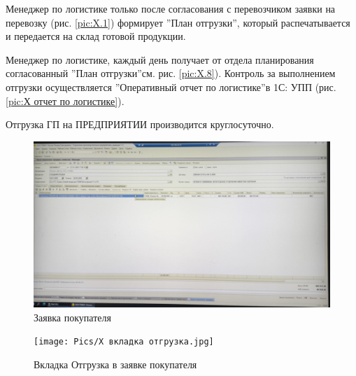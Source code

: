Менеджер по логистике только после согласования с перевозчиком заявки на перевозку (рис. \ref{pic:X.1}) формирует ''План отгрузки'', который распечатывается и передается на склад готовой продукции.

Менеджер по логистике, каждый день получает от отдела планирования согласованный ''План отгрузки''см. рис. \ref{pic:X.8}).
Контроль за выполнением отгрузки осуществляется ''Оперативный отчет по логистике''в 1С: УПП (рис. \ref{pic:Х отчет по логистике}).


Отгрузка ГП на ПРЕДПРИЯТИИ производится круглосуточно.

\clearpage

\begin{figure}
\begin{center}
 \includegraphics[height=0.35\textheight, keepaspectratio]{Pics/Х заказ покупателя.jpg}
\end{center}
 \caption{Заявка покупателя}
 \label{pic:Х заказ покупателя}
\end{figure}

\begin{figure}
\begin{center}
 \texttt{[image: Pics/Х вкладка отгрузка.jpg]}
\end{center}
 \caption{Вкладка Отгрузка в заявке покупателя}
 \label{pic:Х вкладка отгрузка}
\end{figure}

